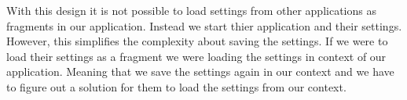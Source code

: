 With this design it is not possible to load settings from other applications as fragments in our application. Instead we start thier application and their settings.
However, this simplifies the complexity about saving the settings.
If we were to load their settings as a fragment we were loading the settings in context of our application. 
Meaning that we save the settings again in our context and we have to figure out a solution for them to load the settings from our context.






